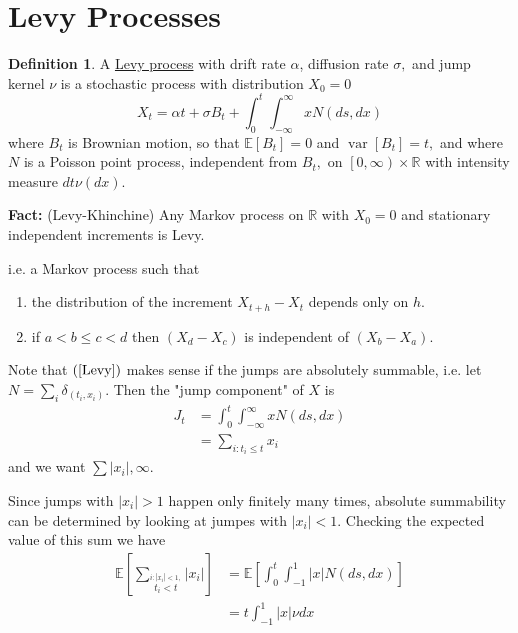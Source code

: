 \documentclass{article}
\newcommand{\R}{\mathbb{R}}    %
\newcommand{\E}{\mathbb{E}}    %
\DeclareMathOperator{\var}{var}
\theoremstyle{definition}
\newtheorem{defn}[thm]{Definition}
\begin{document}
	
	\section{Levy Processes}
	
	\begin{defn}
		A \underline{Levy process} with 
		drift rate $\alpha$,
		diffusion rate $\sigma,$
		and jump kernel $\nu$
		is a stochastic process with distribution $X_0 = 0$
		\begin{equation}
		X_t
		=\alpha t 
		+ \sigma B_t 
		+ \int_{0}^{t} \int_{-\infty}^{\infty} x N(ds , dx) \label{Levy}
		\end{equation}
		where $B_t$ is Brownian motion,
		so that $\E \left[ B_t \right] = 0$
		and $\var \left[ B_t \right] = t,$
		and where $N$ is a Poisson point process, independent from $B_t,$ on
		$\left [ 0 , \infty \right) \times \R$
		with intensity measure $dt \nu(dx).$ 
	\end{defn}
	
	\textbf{Fact:} (Levy-Khinchine)
		Any Markov process on $\R$ with $X_0 = 0$ and stationary independent increments is Levy.
		
		i.e. a Markov process such that
		\begin{enumerate}
			\item the distribution of the increment $X_{t + h} - X_t$ depends only on $h.$ 
			\item if $a < b \leq c < d$ then $(X_d - X_c)$ is independent of $(X_b - X_a).$
		\end{enumerate} 
	
	Note that $(\ref{Levy})$ makes sense if the jumps are absolutely summable, 
	i.e. let $N = \sum_{i} \delta_{(t_i ,x_i)}.$
	Then the "jump component" of $X$ is 
	$$
	\begin{aligned}
	J_t 
	&= \int_{0}^{t} \int _{-\infty}^{\infty} x N(ds, dx) \\
	&= \sum_{i : t_i \leq t} x_i
	\end{aligned}
	$$
	and we want $\sum |x_i| , \infty.$
	
	Since jumps with $|x_i| > 1$ happen only finitely many times, absolute summability can be determined by looking at jumpes with $|x_i| < 1.$
	Checking the expected value of this sum we have
	$$
	\begin{aligned}
	\E \left[ \sum_{\stackrel{i : |x_i| < 1,}{ t_i < t}} |x_i|  \right] 
	& = \E \left[ \int_{0}^{t} \int_{-1}^{1} |x| N(ds, dx)          \right] \\ 
	& = t \int _{-1}^{1} |x| \nu dx
	\end{aligned}
	$$
	
\end{document}
